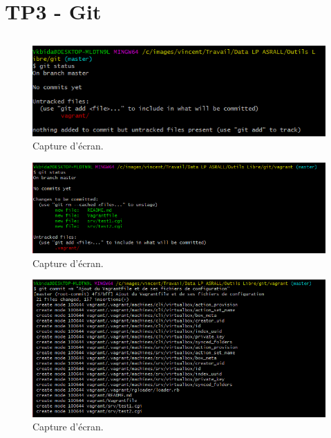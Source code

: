 \documentclass{article}
\begin{document}
\newpage
\section{TP3 - Git}

\subsection{}

\begin{figure}[h]
\centering
\includegraphics[width=\textwidth]{images/q3-1-1.png}
\caption{\label{fig:frog}Capture d'écran.}
\end{figure}

\begin{figure}[h]
\centering
\includegraphics[width=\textwidth]{images/q3-1-2.png}
\caption{\label{fig:frog}Capture d'écran.}
\end{figure}

\begin{figure}[h]
\centering
\includegraphics[width=\textwidth]{images/q3-1-3.png}
\caption{\label{fig:frog}Capture d'écran.}
\end{figure}
\FloatBarrier
\end{document}
